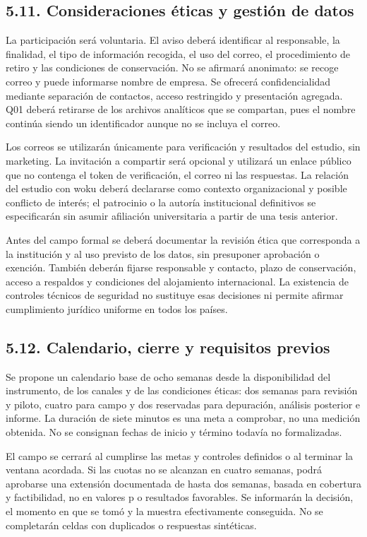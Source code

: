 \documentclass[12pt,letterpaper]{article}
\begin{document}
\subsection*{5.11. Consideraciones éticas y gestión de datos}
La participación será voluntaria. El aviso deberá identificar al responsable, la finalidad, el tipo de información recogida, el uso del correo, el procedimiento de retiro y las condiciones de conservación. No se afirmará anonimato: se recoge correo y puede informarse nombre de empresa. Se ofrecerá confidencialidad mediante separación de contactos, acceso restringido y presentación agregada. Q01 deberá retirarse de los archivos analíticos que se compartan, pues el nombre continúa siendo un identificador aunque no se incluya el correo.

Los correos se utilizarán únicamente para verificación y resultados del estudio, sin marketing. La invitación a compartir será opcional y utilizará un enlace público que no contenga el token de verificación, el correo ni las respuestas. La relación del estudio con woku deberá declararse como contexto organizacional y posible conflicto de interés; el patrocinio o la autoría institucional definitivos se especificarán sin asumir afiliación universitaria a partir de una tesis anterior.

Antes del campo formal se deberá documentar la revisión ética que corresponda a la institución y al uso previsto de los datos, sin presuponer aprobación o exención. También deberán fijarse responsable y contacto, plazo de conservación, acceso a respaldos y condiciones del alojamiento internacional. La existencia de controles técnicos de seguridad no sustituye esas decisiones ni permite afirmar cumplimiento jurídico uniforme en todos los países.

\subsection*{5.12. Calendario, cierre y requisitos previos}
Se propone un calendario base de ocho semanas desde la disponibilidad del instrumento, de los canales y de las condiciones éticas: dos semanas para revisión y piloto, cuatro para campo y dos reservadas para depuración, análisis posterior e informe. La duración de siete minutos es una meta a comprobar, no una medición obtenida. No se consignan fechas de inicio y término todavía no formalizadas.

El campo se cerrará al cumplirse las metas y controles definidos o al terminar la ventana acordada. Si las cuotas no se alcanzan en cuatro semanas, podrá aprobarse una extensión documentada de hasta dos semanas, basada en cobertura y factibilidad, no en valores p o resultados favorables. Se informarán la decisión, el momento en que se tomó y la muestra efectivamente conseguida. No se completarán celdas con duplicados o respuestas sintéticas.
\end{document}

